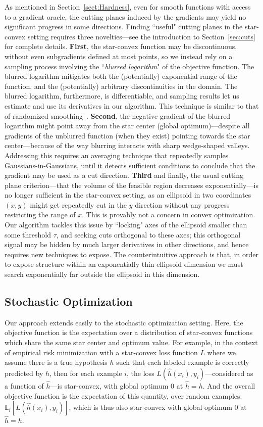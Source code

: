 \documentclass[11pt,letter]{article}
\numberwithin{nTheorems}{section}
\begin{document}
As mentioned in Section~\ref{sect:Hardness}, even for smooth functions with access to a gradient oracle, the cutting planes induced by the gradients may yield no significant progress in some directions.
Finding ``useful" cutting planes in the star-convex setting requires three novelties---see the introduction to Section~\ref{sec:cuts} for complete details. {\bf First}, the star-convex function may be discontinuous, without even subgradients defined at most points, so we instead rely on a sampling process involving the ``\emph{blurred logarithm}" of the objective function. The blurred logarithm mitigates both the (potentially) exponential range of the function, and the (potentially) arbitrary discontinuities in the domain. The blurred logarithm, furthermore, is differentiable, and sampling results let us estimate and use its derivatives in our algorithm. This technique is similar to that of randomized smoothing~\cite{Duchi:2012}. {\bf Second}, the negative gradient of the blurred logarithm might point away from the star center (global optimum)---despite all gradients of the unblurred function (when they exist) pointing towards the star center---because of the way blurring interacts with sharp wedge-shaped valleys. Addressing this requires an averaging technique that repeatedly samples Gaussians-in-Gaussians, until it detects sufficient conditions to conclude that the gradient may be used as a cut direction. {\bf Third} and finally, the usual cutting plane criterion---that the volume of the feasible region decreases exponentially---is no longer sufficient in the star-convex setting, as an ellipsoid in two coordinates $(x,y)$ might get repeatedly cut in the $y$ direction without any progress restricting the range of $x$. This is provably not a concern in convex optimization. Our algorithm tackles this issue by ``locking" axes of the ellipsoid smaller than some threshold $\tau$, and seeking cuts orthogonal to these axes; this orthogonal signal may be hidden by much larger derivatives in other directions, and hence requires new techniques to expose. The counterintuitive approach is that, in order to expose structure within an exponentially thin ellipsoid dimension we must search exponentially far outside the ellipsoid in this dimension.

\subsection{Stochastic Optimization}
Our approach extends easily to the stochastic optimization setting.
Here, the objective function is the expectation over a distribution of star-convex functions which share the same star center and optimum value.
For example, in the context of empirical risk minimization with a star-convex loss function $L$ where we assume there is a true hypothesis $h$ such that each labeled example is correctly predicted by $h$, then for each example $i$, the loss $L(\hat{h}(x_i), y_i)$---considered as a function of $\hat{h}$---is star-convex, with global optimum 0 at $\hat{h}=h$. And the overall objective function is the expectation of this quantity, over random examples: $\mathbb{E}_i[L(\hat{h}(x_i), y_i)]$, which is thus also star-convex with global optimum 0 at $\hat{h}=h$.
\end{document}
